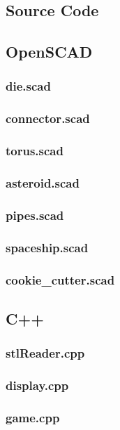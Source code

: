 \documentclass[12pt]{article}
\begin{document}
\begin{onehalfspace}
\section*{Source Code}
\subsection*{OpenSCAD}
\subsubsection*{die.scad}
\subsubsection*{connector.scad}
\subsubsection*{torus.scad}
\subsubsection*{asteroid.scad}
\subsubsection*{pipes.scad}
\subsubsection*{spaceship.scad}
\subsubsection*{cookie\_cutter.scad}

\subsection*{C++}
\subsubsection*{stlReader.cpp}
% 
\subsubsection*{display.cpp}
% 
\subsubsection*{game.cpp}
% 


\end{onehalfspace}
\end{document}
